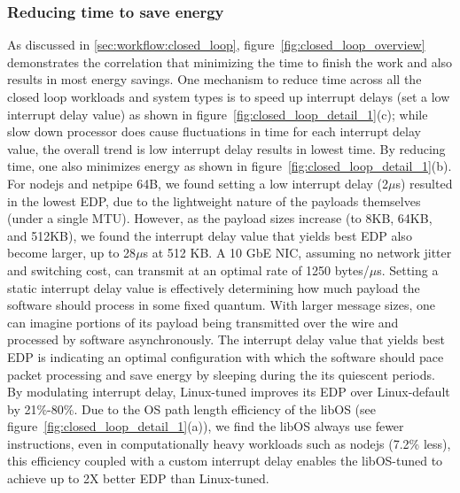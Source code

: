 \subsubsection{Reducing time to save energy}
\label{sec:closed_loop:speedup}
As discussed in \cref{sec:workflow:closed_loop}, figure~\ref{fig:closed_loop_overview} demonstrates the correlation that minimizing the time to finish the work and also results in most energy savings. One mechanism to reduce time across all the closed loop workloads and system types is to speed up interrupt delays (set a low interrupt delay value) as shown in figure~\ref{fig:closed_loop_detail_1}(c); while slow down processor does cause fluctuations in time for each interrupt delay value, the overall trend is low interrupt delay results in lowest time. By reducing time, one also minimizes energy as shown in figure~\ref{fig:closed_loop_detail_1}(b). For nodejs and netpipe 64B, we found setting a low interrupt delay (2$\mu$s) resulted in the lowest EDP, due to the lightweight nature of the payloads themselves (under a single MTU). However, as the payload sizes increase (to 8KB, 64KB, and 512KB), we found the interrupt delay value that yields best EDP also become larger, up to 28$\mu$s at 512 KB. A 10 GbE NIC, assuming no network jitter and switching cost, can transmit at an optimal rate of 1250 bytes/$\mu$s. Setting a static interrupt delay value is effectively determining how much payload the software should process in some fixed quantum. With larger message sizes, one can imagine portions of its payload being transmitted over the wire and processed by software asynchronously. The interrupt delay value that yields best EDP is indicating an optimal configuration with which the software should pace packet processing and save energy by sleeping during the its quiescent periods. By modulating interrupt delay, Linux-tuned improves its EDP over Linux-default by 21\%-80\%. Due to the OS path length efficiency of the libOS (see figure~\ref{fig:closed_loop_detail_1}(a)), we find the libOS always use fewer instructions, even in computationally heavy workloads such as nodejs (7.2\% less), this efficiency coupled with a custom interrupt delay enables the libOS-tuned to achieve up to 2X better EDP than Linux-tuned.


